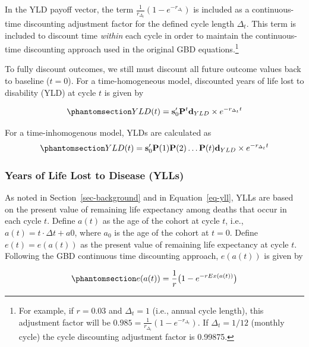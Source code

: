 \documentclass[
]{agujournal2019}
\begin{document}
In the YLD payoff vector, the term
\(\frac{1}{r_{\Delta_t}}(1-e^{-r_{\Delta_t}})\) is included as a
continuous-time discounting adjustment factor for the defined cycle
length \(\Delta_t\). This term is included to discount time
\emph{within} each cycle in order to maintain the continuous-time
discounting approach used in the original GBD equations.\footnote{For
  example, if \(r=0.03\) and \(\Delta_t=1\) (i.e., annual cycle length),
  this adjustment factor will be
  \(0.985 = \frac{1}{r_{\Delta_t}}(1-e^{-r_{\Delta_t}})\). If
  \(\Delta_t=1/12\) (monthly cycle) the cycle discounting adjustment
  factor is 0.99875.}

To fully discount outcomes, we still must discount all future outcome
values back to baseline (\(t=0\)). For a time-homogeneous model,
discounted years of life lost to disability (YLD) at cycle \(t\) is
given by

\begin{equation}\phantomsection\label{eq-yldt}{
YLD(t)=\mathbf{s}'_0 \mathbf{P}^t \mathbf{d}_{YLD}  \times{e^{-r_{\Delta_t} t}}
}\end{equation}

For a time-inhomogenous model, YLDs are calculated as
\begin{equation}\phantomsection\label{eq-yldt-inhomo}{
YLD(t)=\mathbf{s}'_0 \mathbf{P}(1)\mathbf{P}(2)\dots\mathbf{P}(t)  \mathbf{d}_{YLD}  \times{e^{-r_{\Delta_t} t}}
}\end{equation}

\subsubsection{Years of Life Lost to Disease
(YLLs)}\label{years-of-life-lost-to-disease-ylls}

As noted in Section~\ref{sec-background} and in Equation~\ref{eq-yll},
YLLs are based on the present value of remaining life expectancy among
deaths that occur in each cycle \(t\). Define \(a(t)\) as the age of the
cohort at cycle \(t\), i.e., \(a(t) = t \cdot \Delta t + a0\), where
\(a_0\) is the age of the cohort at \(t=0\). Define \(e(t)=e(a(t))\) as
the present value of remaining life expectancy at cycle \(t\). Following
the GBD continuous time discounting approach, \(e(a(t))\) is given by

\begin{equation}\phantomsection\label{eq-pvEx}{
e(a(t)) = \frac{1}{r}\big (1 - e^{-rEx(a(t))} \big )
}\end{equation}
\end{document}
